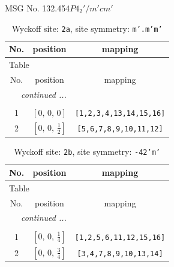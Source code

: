 \documentclass[fleqn,8pt]{jsarticle}
\begin{document}
\setcounter{MaxMatrixCols}{32}

\renewcommand{\tablename}{Table~}
\renewcommand{\figurename}{Figure~}
\begin{center}
\LARGE
MSG No. 132.454\quad$P4_{2}'/m'cm'$
\end{center}
\renewcommand{\arraystretch}{1.2}
\begin{longtable}{ccc}
\caption{Wyckoff site: {\tt 2a}, site symmetry: {\tt m'.m'm'}}
 \\
 \hline \hline
No. & position & mapping \\ \hline \endfirsthead

\multicolumn{2}{l}{\tablename\ \thetable{}} \\
 \hline \hline
No. & position & mapping \\ \hline \endhead

 \hline \hline
\multicolumn{2}{r}{\footnotesize\it continued ...} \\ \endfoot

 \hline \hline
\multicolumn{2}{r}{} \\ \endlastfoot

1 & $\left[ 0,\, 0,\, 0 \right]$ & {\tt [1,2,3,4,13,14,15,16]} \\ \hline
2 & $\left[ 0,\, 0,\, \frac{1}{2} \right]$ & {\tt [5,6,7,8,9,10,11,12]} \\
\end{longtable}
\renewcommand{\arraystretch}{1.2}
\begin{longtable}{ccc}
\caption{Wyckoff site: {\tt 2b}, site symmetry: {\tt -42'm'}}
 \\
 \hline \hline
No. & position & mapping \\ \hline \endfirsthead

\multicolumn{2}{l}{\tablename\ \thetable{}} \\
 \hline \hline
No. & position & mapping \\ \hline \endhead

 \hline \hline
\multicolumn{2}{r}{\footnotesize\it continued ...} \\ \endfoot

 \hline \hline
\multicolumn{2}{r}{} \\ \endlastfoot

1 & $\left[ 0,\, 0,\, \frac{1}{4} \right]$ & {\tt [1,2,5,6,11,12,15,16]} \\ \hline
2 & $\left[ 0,\, 0,\, \frac{3}{4} \right]$ & {\tt [3,4,7,8,9,10,13,14]} \\
\end{longtable}
\end{document}
